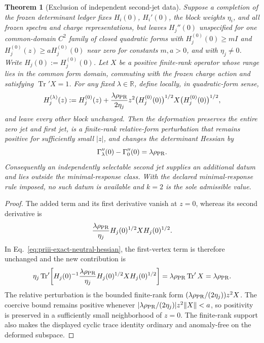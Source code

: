 \documentclass[11pt]{article}
\newtheorem{theorem}{Theorem}[section]
\begin{document}
\begin{theorem}[Exclusion of independent second-jet data]
\label{thm:priii-second-jet-obstruction}
Suppose a completion of the frozen determinant ledger fixes \(H_i(0)\), \(H_i'(0)\), the block
weights \(\eta_i\), and all frozen spectra and charge representations, but leaves
\(H_j''(0)\) unspecified for one common-domain \(C^2\) family of closed quadratic forms with
\(H_j^{(0)}(0)\ge mI\) and
\(H_j^{(0)}(z)\ge aH_j^{(0)}(0)\) near zero for constants \(m,a>0\), and with
\(\eta_j\ne0\).  Write \(H_j(0):=H_j^{(0)}(0)\).  Let \(X\) be a positive
finite-rank operator whose range lies
in the common form domain, commuting with the frozen charge action and satisfying
\(\operatorname{Tr}'X=1\).  For any fixed \(\lambda\in\mathbb R\), define locally, in
quadratic-form sense,
\begin{equation}
H_j^{(\lambda)}(z)
:=
H_j^{(0)}(z)
+\frac{\lambda\rho_{\rm PR}}{2\eta_j}z^2
\bigl(H_j^{(0)}(0)\bigr)^{1/2}X
\bigl(H_j^{(0)}(0)\bigr)^{1/2},
\label{eq:priii-second-jet-deformation}
\end{equation}
and leave every other block unchanged.  Then the deformation preserves the entire zero jet and
first jet, is a finite-rank relative-form perturbation that remains positive for sufficiently
small \(|z|\), and changes the determinant Hessian by
\begin{equation}
\Gamma_{\lambda}''(0)-\Gamma_0''(0)
=\lambda\rho_{\rm PR}.
\label{eq:priii-second-jet-hessian-shift}
\end{equation}
Consequently an independently selectable second jet supplies an additional
datum and lies outside the minimal-response class.  With the declared
minimal-response rule imposed, no such datum is available and \(k=2\) is the
sole admissible value.
\end{theorem}

\begin{proof}
The added term and its first derivative vanish at \(z=0\), whereas its second derivative is
\begin{equation}
\frac{\lambda\rho_{\rm PR}}{\eta_j}
H_j(0)^{1/2}XH_j(0)^{1/2}.
\end{equation}
In
Eq.~\eqref{eq:priii-exact-neutral-hessian}, the first-vertex term is therefore unchanged and the
new contribution is
\begin{equation}
\eta_j\operatorname{Tr}'\!\left[
H_j(0)^{-1}\frac{\lambda\rho_{\rm PR}}{\eta_j}
H_j(0)^{1/2}XH_j(0)^{1/2}\right]
=\lambda\rho_{\rm PR}\operatorname{Tr}'X
=\lambda\rho_{\rm PR}.
\end{equation}
The relative perturbation is the bounded finite-rank form
\((\lambda\rho_{\rm PR}/(2\eta_j))z^2X\).  The coercive bound remains positive whenever
\(\lvert\lambda\rho_{\rm PR}/(2\eta_j)\rvert z^2\lVert X\rVert<a\), so positivity is preserved
in a sufficiently small
neighborhood of \(z=0\).  The finite-rank support also makes the displayed cyclic trace
identity ordinary and anomaly-free on the deformed subspace.
\end{proof}
\end{document}
